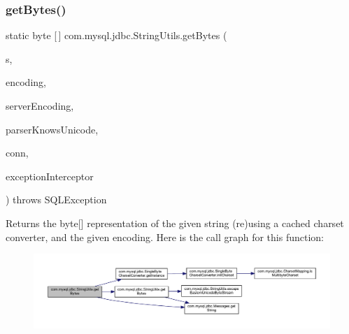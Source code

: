 \subsubsection{\texorpdfstring{get\+Bytes()}{getBytes()}\hspace{0.1cm}{\footnotesize\ttfamily [6/7]}}
{\footnotesize\ttfamily static byte \mbox{[}$\,$\mbox{]} com.\+mysql.\+jdbc.\+String\+Utils.\+get\+Bytes (\begin{DoxyParamCaption}\item[{String}]{s,  }\item[{String}]{encoding,  }\item[{String}]{server\+Encoding,  }\item[{boolean}]{parser\+Knows\+Unicode,  }\item[{\mbox{\hyperlink{interfacecom_1_1mysql_1_1jdbc_1_1_my_s_q_l_connection}{My\+S\+Q\+L\+Connection}}}]{conn,  }\item[{\mbox{\hyperlink{interfacecom_1_1mysql_1_1jdbc_1_1_exception_interceptor}{Exception\+Interceptor}}}]{exception\+Interceptor }\end{DoxyParamCaption}) throws S\+Q\+L\+Exception\hspace{0.3cm}{\ttfamily [static]}}

Returns the byte\mbox{[}\mbox{]} representation of the given string (re)using a cached charset converter, and the given encoding. Here is the call graph for this function\+:
\nopagebreak
\begin{figure}[H]
\begin{center}
\leavevmode
\includegraphics[width=350pt]{classcom_1_1mysql_1_1jdbc_1_1_string_utils_a6b5fe6d3bbd403144a59f29d4fb9984a_cgraph}
\end{center}
\end{figure}
\mbox{\label{classcom_1_1mysql_1_1jdbc_1_1_string_utils_a0782bc62fd8f75d707d84487c9cd50cc}} 
